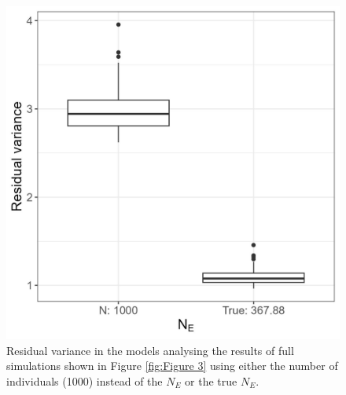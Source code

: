 \documentclass[12pt]{article}
\begin{document}
\begin{bibunit}


\newpage
\begin{figure}[H]
\centering
\includegraphics[scale = 0.15]{Figures/FigS3.jpg}
\caption{Residual variance in the models analysing the results of full simulations shown in Figure \ref{fig:Figure 3} using either the number of individuals (1000) instead of the $N_E$ or the true $N_E$.}
  \label{fig:Figure S3}
\end{figure}

\putbib
\end{bibunit}




\end{document}
